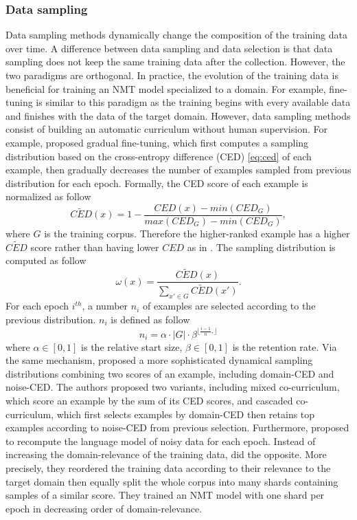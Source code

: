 \subsubsection{Data sampling}
Data sampling methods dynamically change the composition of the training data over time. A difference between data sampling and data selection is that data sampling does not keep the same training data after the collection. However, the two paradigms are orthogonal. In practice, the evolution of the training data is beneficial for training an NMT model specialized to a domain. For example, fine-tuning is similar to this paradigm as the training begins with every available data and finishes with the data of the target domain. However, data sampling methods consist of building an automatic curriculum without human supervision. For example, \citet{Wees17dynamic} proposed gradual fine-tuning, which first computes a sampling distribution based on the cross-entropy difference (CED) \eqref{eq:ced} of each example, then gradually decreases the number of examples sampled from previous distribution for each epoch. Formally, the CED score of each example is normalized as follow
\begin{equation}
\tilde{CED}(x) = 1 - \frac{CED(x)-min(CED_{G})}{max(CED_{G}) - min(CED_{G})},
\end{equation}
where $G$ is the training corpus. Therefore the higher-ranked example has a higher $\tilde{CED}$ score rather than having lower $CED$ as in \citet{Axelrod11domain}. The sampling distribution is computed as follow
\begin{equation}
\omega(x) = \frac{\tilde{CED}(x)}{\sum_{x'\in G} \tilde{CED}(x')}.
\end{equation}
For each epoch $i^{th}$, a number $n_i$ of examples are selected according to the previous distribution. $n_i$ is defined as follow
\begin{equation}
n_i = \alpha \cdot |G| \cdot \beta^{\lfloor \frac{i-1}{n}, \rfloor}
\end{equation}
where $\alpha \in [0,1]$ is the relative start size, $\beta \in [0,1]$ is the retention rate. Via the same mechanism, \citet{Wang19dynamically} proposed a more sophisticated dynamical sampling distributions combining two scores of an example, including domain-CED and noise-CED. The authors proposed two variants, including mixed co-curriculum, which score an example by the sum of its CED scores, and cascaded co-curriculum, which first selects examples by domain-CED then retains top examples according to noise-CED from previous selection. Furthermore, \citet{Wang19dynamically} proposed to recompute the language model of noisy data for each epoch. Instead of increasing the domain-relevance of the training data, \citet{Zhang19curriculum} did the opposite. More precisely, they reordered the training data according to their relevance to the target domain then equally split the whole corpus into many shards containing samples of a similar score. They trained an NMT model with one shard per epoch in decreasing order of domain-relevance.

